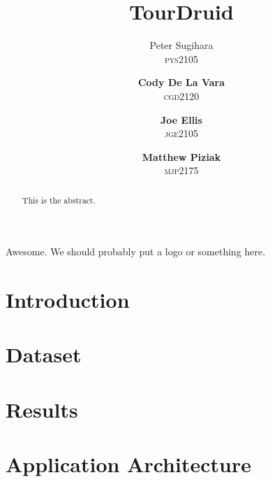 \documentclass{article}
\title{TourDruid}
\author{Peter Sugihara\\ \textsc{pys2105}
\and \textbf{Cody De La Vara}\\ \textsc{cgd2120}
\and \textbf{Joe Ellis}\\ \textsc{jge2105}
\and \textbf{Matthew Piziak}\\ \textsc{mjp2175}}
\newcommand{\sectionfile}[3]{\section{#1} \label{sec:#2} }
\begin{document}
\maketitle

Awesome. We should probably put a logo or something here.

\vspace*{3cm}

\begin{abstract}

This is the abstract.

\end{abstract}

\newpage

\tableofcontents


\newpage

\sectionfile{Introduction}{introduction}{introduction.tex}

\sectionfile{Dataset}{dataset}{dataset.tex}

\sectionfile{Results}{results}{results.tex}

\sectionfile{Application Architecture}{application_architecture}{application_architecture.tex}
\end{document}
